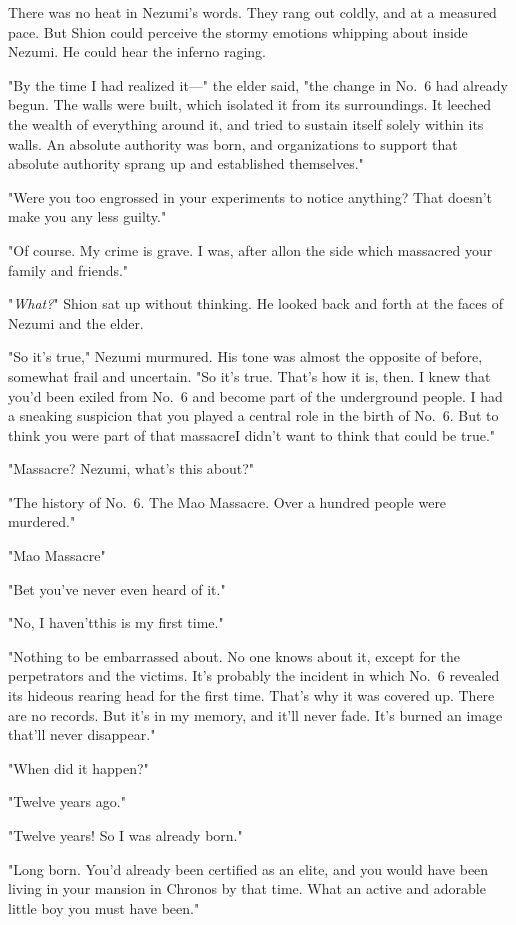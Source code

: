 There was no heat in Nezumi's words. They rang out coldly, and at a
measured pace. But Shion could perceive the stormy emotions whipping
about inside Nezumi. He could hear the inferno raging.

"By the time I had realized it---" the elder said, "the change in No.~6
had already begun. The walls were built, which isolated it from its
surroundings. It leeched the wealth of everything around it, and tried
to sustain itself solely within its walls. An absolute authority was
born, and organizations to support that absolute authority sprang up and
established themselves."

"Were you too engrossed in your experiments to notice anything? That
doesn't make you any less guilty."

"Of course. My crime is grave. I was, after all\el on the side which
massacred your family and friends."

"\emph{What?}" Shion sat up without thinking. He looked back and forth at the
faces of Nezumi and the elder.

"So it's true," Nezumi murmured. His tone was almost the opposite of
before, somewhat frail and uncertain. "So it's true. That's how it is,
then. I knew that you'd been exiled from No.~6 and become part of the
underground people. I had a sneaking suspicion that you played a central
role in the birth of No.~6. But to think you were part of that
massacre\el I didn't want to think that could be true."

"Massacre? Nezumi, what's this about?"

"The history of No.~6. The Mao Massacre. Over a hundred people were
murdered."

"Mao Massacre\el "

"Bet you've never even heard of it."

"No, I haven't\el this is my first time."

"Nothing to be embarrassed about. No one knows about it, except for the
perpetrators and the victims. It's probably the incident in which No.~6
revealed its hideous rearing head for the first time. That's why it was
covered up. There are no records. But it's in my memory, and it'll never
fade. It's burned an image that'll never disappear."

"When did it happen?"

"Twelve years ago."

"Twelve years! So I was already born."

"Long born. You'd already been certified as an elite, and you would have
been living in your mansion in Chronos by that time. What an active and
adorable little boy you must have been."

